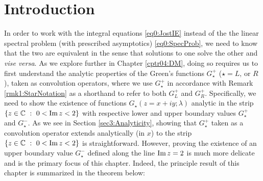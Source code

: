 \documentclass[../dissertation.tex]{subfiles}
\begin{document}
\setcounter{section}{-1}
\section{Introduction}\label{sec3:Intro}
In order to work with the integral 
equations \eqref{eq0:JostIE} instead of the the linear spectral problem (with 
prescribed asymptotics) \eqref{eq0:SpecProb}, we need to know that the two are 
equivalent in the sense that solutions to one solve the other and \textit{vise
versa}. As we explore further in Chapter \ref{cptr04:DM}, doing so requires
us to first understand the analytic properties of the Green's functions 
$G_\star^+$ ($\star = L \text{, or }R$), taken as convolution operators, where 
we use $G_\star^+$ in accordance with Remark \ref{rmk1:StarNotation} as a 
shorthand to refer to both $G_L^+$ and $G_R^+$. Specifically, we need to show 
the existence of functions $G_\star(z=x+iy; \lambda)$ analytic in the strip 
$\{z \in \mathbb C ~:~ 0 < \operatorname{Im} z < 2 \}$ with respective 
lower and upper boundary values $G_\star^+$ and $G_\star^-$. As we 
see in Section \ref{sec3:Analyticity}, showing that $G_\star^+$ taken as a 
convolution operator extends analytically (in $x$) to the strip 
$\{z \in \mathbb C ~:~ 0 < \operatorname{Im} z < 2 \}$ is straightforward. However, proving the 
existence of an upper boundary value $G_\star^-$ defined along the line $\operatorname{Im} z = 2$
is much more delicate and is the primary focus of this chapter. Indeed, the principle
result of this chapter is summarized in the theorem below:
\end{document}

